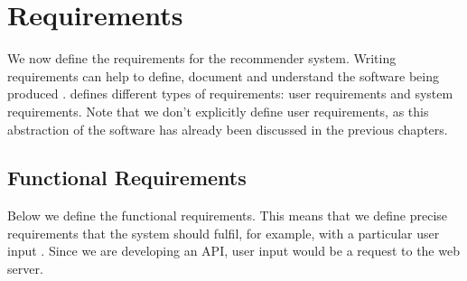 \chapter{Requirements}

We now define the requirements for the recommender system. Writing requirements can help to define, document and understand the software being produced \cite{sommerville2011software}. \cite{sommerville2011software} defines different types of requirements: user requirements and system requirements. Note that we don't explicitly define user requirements, as this abstraction of the software has already been discussed in the previous chapters.

\section{Functional Requirements}

Below we define the functional requirements. This means that we define precise requirements that the system should fulfil, for example, with a particular user input \cite{sommerville2011software}. Since we are developing an API, user input would be a request to the web server.

